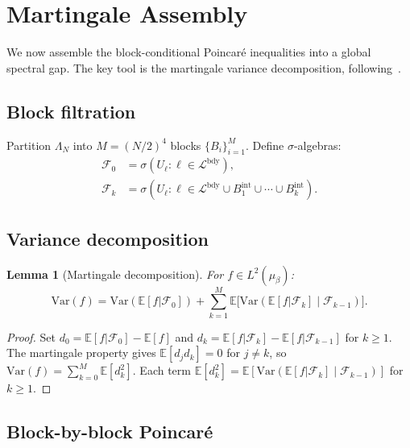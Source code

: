 \documentclass[11pt,a4paper]{article}
\theoremstyle{plain}
\newtheorem{lemma}[theorem]{Lemma}
\theoremstyle{definition}
\theoremstyle{remark}
\newcommand{\E}{\mathbb{E}}
\newcommand{\Var}{\mathrm{Var}}
\newcommand{\cF}{\mathcal{F}}
\newcommand{\cL}{\mathcal{L}}
\begin{document}
\section{Martingale Assembly}\label{sec:assembly}

We now assemble the block-conditional Poincar\'e inequalities into a
global spectral gap. The key tool is the martingale variance
decomposition, following~\cite{StroockZegarlinski1992}.

\subsection{Block filtration}

Partition $\Lambda_N$ into $M = (N/2)^4$ blocks $\{B_i\}_{i=1}^M$.
Define $\sigma$-algebras:
\begin{align}
\cF_0 &= \sigma(U_\ell : \ell \in \cL^{\mathrm{bdy}}), \\
\cF_k &= \sigma(U_\ell : \ell \in \cL^{\mathrm{bdy}}
\cup B_1^{\mathrm{int}} \cup \cdots \cup B_k^{\mathrm{int}}).
\end{align}

\subsection{Variance decomposition}

\begin{lemma}[Martingale decomposition]\label{lem:var-decomp}
For $f \in L^2(\mu_\beta)$:
\begin{equation}
\Var(f) = \Var(\E[f|\cF_0])
+ \sum_{k=1}^M \E\bigl[\Var(\E[f|\cF_k] \mid \cF_{k-1})\bigr].
\end{equation}
\end{lemma}

\begin{proof}
Set $d_0 = \E[f|\cF_0] - \E[f]$ and $d_k = \E[f|\cF_k] - \E[f|\cF_{k-1}]$
for $k \geq 1$. The martingale property gives $\E[d_j d_k] = 0$ for
$j \neq k$, so $\Var(f) = \sum_{k=0}^M \E[d_k^2]$. Each term
$\E[d_k^2] = \E[\Var(\E[f|\cF_k] \mid \cF_{k-1})]$ for $k \geq 1$.
\end{proof}

\subsection{Block-by-block Poincar\'e}
\end{document}
